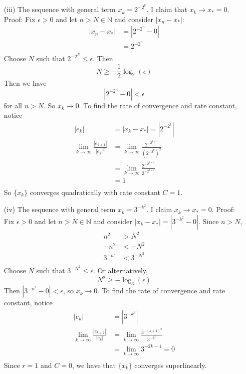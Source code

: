 \documentclass{article}
\begin{document}
\begin{itemize}
    \item[(iii)] The sequence with general term $x_k = 2^{-2^k}$.
    \newline\newline
    I claim that $x_k \to x_* = 0$. 
    \newline
    Proof: Fix $\epsilon > 0$ and let $n > N \in \mathbb{N}$ and consider $|x_n - x_*|$:
    \begin{align*}
        |x_n - x_*| &= |2^{-2^n} - 0| \\
        &= 2^{-2^n} \\
    \end{align*}
    Choose $N$ such that $2^{-2^N} \leq \epsilon$. Then 
    \[N \geq -\frac{1}{2}\log_2(\epsilon)\]
    Then we have
    \[|2^{-2^n} - 0| < \epsilon\]
    for all $n > N$. So $x_k \to 0$.
    \newline\newline
    To find the rate of convergence and rate constant, notice
    \begin{align*}
        |e_k| &= |x_k - x_*| = |2^{-2^k}| \\
        \lim_{k \to \infty} \frac{|e_{k+1}|}{|e_k|^2} &= \lim_{k \to \infty} \frac{2^{-2^{k+1}}}{(2^{-2^k})^2} \\
        &= \lim_{k \to \infty} \frac{2^{-2^{k+1}}}{2^{-2^{k+1}}} \\
        &= 1 \\
    \end{align*}
    So $\{x_k\}$ converges quadratically with rate constant $C = 1$.

    \item[(iv)] The sequence with general term $x_k = 3^{-k^2}$.
    \newline\newline
    I claim $x_k \to x_* = 0$.
    \newline
    Proof: Fix $\epsilon > 0$ and let $n > N\in \mathbb{N}$ and consider $|x_k - x_*| = |3^{-k^2} - 0|$. Since $n > N$,
    \begin{align*}
        n^2 &> N^2 \\
        -n^2 &< -N^2 \\
        3^{-n^2} &< 3^{-N^2} \\
    \end{align*}
    Choose $N$ such that $3^{-N^2} \leq \epsilon$. Or alternatively,
    \[N^2 \geq -\log_3(\epsilon)\]
    Then $|3^{-n^2} - 0| < \epsilon$, so $x_k \to 0$.
    \newline\newline
    To find the rate of convergence and rate constant, notice
    \begin{align*}
        |e_k| &= |3^{-k^2}| \\
        \lim_{k\to\infty} \frac{|e_{k+1}|}{|e_k|} &= \lim_{k\to\infty} \frac{3^{-(k+1)^2}}{3^{-k^2}} \\
        &= \lim_{k\to\infty} 3^{-2k-1} = 0 \\
    \end{align*}
    Since $r = 1$ and $C = 0$, we have that $\{x_k\}$ converges superlinearly.


\end{itemize}
\end{document}
